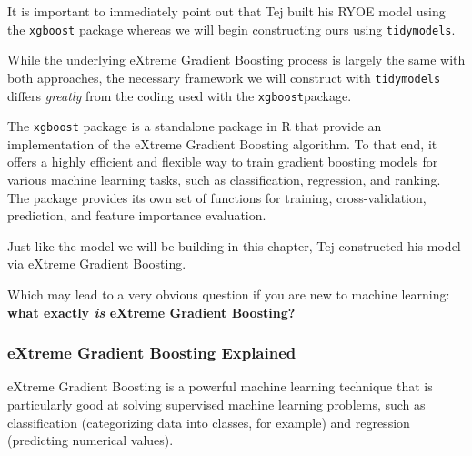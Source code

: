 \documentclass[
  letterpaper,
]{krantz}
\begin{document}
\begin{tcolorbox}[enhanced jigsaw, colback=white, leftrule=.75mm, breakable, colframe=quarto-callout-important-color-frame, bottomtitle=1mm, rightrule=.15mm, left=2mm, opacityback=0, bottomrule=.15mm, arc=.35mm, coltitle=black, colbacktitle=quarto-callout-important-color!10!white, toptitle=1mm, titlerule=0mm, title=\textcolor{quarto-callout-important-color}{\faExclamation}\hspace{0.5em}{Important}, toprule=.15mm, opacitybacktitle=0.6]

It is important to immediately point out that Tej built his RYOE model
using the \texttt{xgboost} package whereas we will begin constructing
ours using \texttt{tidymodels}.

While the underlying eXtreme Gradient Boosting process is largely the
same with both approaches, the necessary framework we will construct
with \texttt{tidymodels} differs \emph{greatly} from the coding used
with the \texttt{xgboost}package.

The \texttt{xgboost} package is a standalone package in R that provide
an implementation of the eXtreme Gradient Boosting algorithm. To that
end, it offers a highly efficient and flexible way to train gradient
boosting models for various machine learning tasks, such as
classification, regression, and ranking. The package provides its own
set of functions for training, cross-validation, prediction, and feature
importance evaluation.

\end{tcolorbox}

Just like the model we will be building in this chapter, Tej constructed
his model via eXtreme Gradient Boosting.

Which may lead to a very obvious question if you are new to machine
learning: \textbf{what exactly \emph{is} eXtreme Gradient Boosting?}

\hypertarget{extreme-gradient-boosting-explained}{%
\subsubsection{eXtreme Gradient Boosting
Explained}\label{extreme-gradient-boosting-explained}}

eXtreme Gradient Boosting is a powerful machine learning technique that
is particularly good at solving supervised machine learning problems,
such as classification (categorizing data into classes, for example) and
regression (predicting numerical values).
\end{document}
